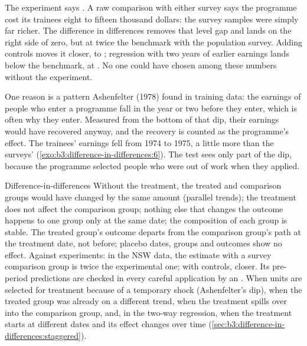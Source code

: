 \label{lst:b3:difference-in-differences:lalonde}

\label{out:b3:difference-in-differences:lalonde}

The experiment says . %
A raw comparison with either survey says the programme cost its trainees eight
to fifteen thousand dollars: the survey samples were simply far richer. The
difference in differences removes that level gap and lands on the right side
of zero, but at twice the benchmark with the population survey. Adding controls
moves it closer, to ; regression with two years of earlier earnings
lands below the benchmark, at . %
No one could have chosen among these numbers without the experiment.

One reason is a pattern Ashenfelter (1978) found in training data: the
earnings of people who enter a programme fall in the year or two before they
enter, which is often why they enter. Measured from the bottom of that dip,
their earnings would have recovered anyway, and the recovery is counted as the
programme's effect. The trainees' earnings fell from 1974 to 1975, a little
more than the surveys' (\cref{exo:b3:difference-in-differences:6}). The test
sees only part of the dip, because the programme selected people who were out
of work when they applied.

\begin{model}{Difference-in-differences}
\assumes Without the treatment, the treated and comparison groups would have
changed by the same amount (parallel trends); the treatment does not affect
the comparison group; nothing else that changes the outcome happens to one
group only at the same date; the composition of each group is stable.
\predicts The treated group's outcome departs from the comparison group's
path at the treatment date, not before; placebo dates, groups and outcomes show
no effect.
\tested Against experiments: in the NSW data, the estimate with a survey
comparison group is twice the experimental one; with controls, closer. Its
pre-period predictions are checked in every careful application by an .
\breaks When units are selected for treatment because of a temporary shock
(Ashenfelter's dip), when the treated group was already on a different trend,
when the treatment spills over into the comparison group, and, in the
two-way regression, when the treatment starts at different dates and its
effect changes over time (\cref{sec:b3:difference-in-differences:staggered}).
\end{model}

